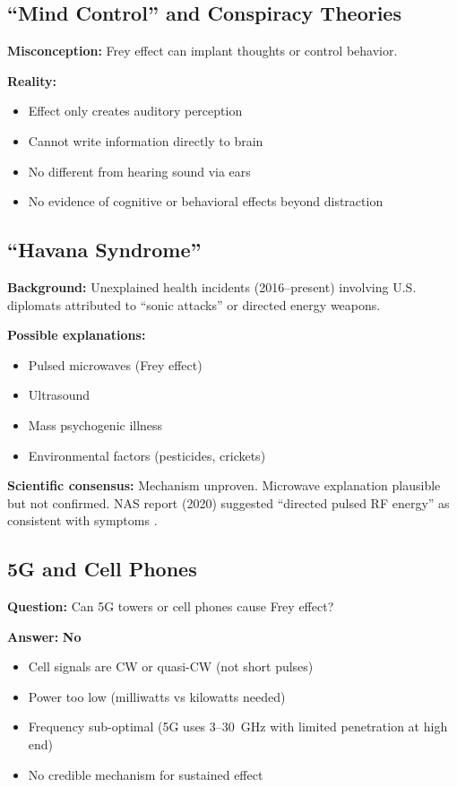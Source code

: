 \subsection{``Mind Control'' and Conspiracy Theories}

\textbf{Misconception:} Frey effect can implant thoughts or control behavior.

\textbf{Reality:}
\begin{itemize}
\item Effect only creates auditory perception
\item Cannot write information directly to brain
\item No different from hearing sound via ears
\item No evidence of cognitive or behavioral effects beyond distraction
\end{itemize}

\subsection{``Havana Syndrome''}

\textbf{Background:} Unexplained health incidents (2016--present) involving U.S. diplomats attributed to ``sonic attacks'' or directed energy weapons.

\textbf{Possible explanations:}
\begin{itemize}
\item Pulsed microwaves (Frey effect)
\item Ultrasound
\item Mass psychogenic illness
\item Environmental factors (pesticides, crickets)
\end{itemize}

\textbf{Scientific consensus:} Mechanism unproven. Microwave explanation plausible but not confirmed. NAS report (2020) suggested ``directed pulsed RF energy'' as consistent with symptoms \cite{NAS2020}.

\subsection{5G and Cell Phones}

\textbf{Question:} Can 5G towers or cell phones cause Frey effect?

\textbf{Answer:} \textbf{No}
\begin{itemize}
\item Cell signals are CW or quasi-CW (not short pulses)
\item Power too low (milliwatts vs kilowatts needed)
\item Frequency sub-optimal (5G uses 3--30~GHz with limited penetration at high end)
\item No credible mechanism for sustained effect
\end{itemize}

